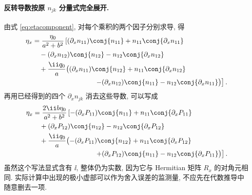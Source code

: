 \paragraph{反转导数按原 $n_{jk}$ 分量式完全展开.}
由式 \eqref{eq:etacomponent}, 对每个乘积的两个因子分别求导, 得
\begin{align*}
\eta_x
&=\dfrac{\eta_0}{a^2+b^2}\left[
(\partial_xn_{11})\conj{n_{11}}
+n_{11}\conj{\partial_xn_{11}}\right.\\
&\quad-(\partial_xn_{12})\conj{n_{12}}
-n_{12}\conj{\partial_xn_{12}}\\
&\quad+\dfrac{\ii q_0}{a}\bigl(
(\partial_xn_{11})\conj{n_{12}}
+n_{11}\conj{\partial_xn_{12}}\\
&\hspace{32mm}\left.
-(\partial_xn_{12})\conj{n_{11}}
-n_{12}\conj{\partial_xn_{11}}\bigr)\right].
\end{align*}
再用已经得到的四个 $\partial_xn_{jk}$ 消去这些导数, 可以写成
\begin{align*}
\eta_x
&=\dfrac{2\ii b\eta_0}{a^2+b^2}\left[
-(\partial_xP_{11})\conj{n_{11}}
+n_{11}\conj{\partial_xP_{11}}\right.\\
&\quad+(\partial_xP_{12})\conj{n_{12}}
-n_{12}\conj{\partial_xP_{12}}\\
&\quad+\dfrac{\ii q_0}{a}\bigl(
-(\partial_xP_{11})\conj{n_{12}}
+n_{11}\conj{\partial_xP_{12}}\\
&\hspace{32mm}\left.
+(\partial_xP_{12})\conj{n_{11}}
-n_{12}\conj{\partial_xP_{11}}\bigr)\right].
\end{align*}
虽然这个写法显式含有 $\ii$, 整体仍为实数, 因为它与 Hermitian 矩阵 $R_x$ 的对角元相同. 实际计算中出现的极小虚部可以作为舍入误差的监测量, 不应先在代数推导中随意删去一项.

